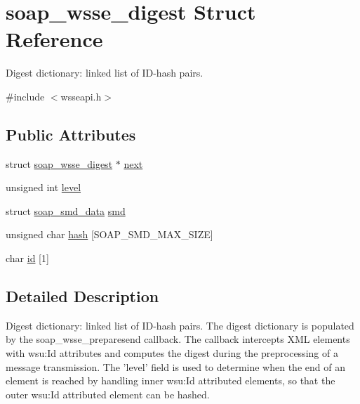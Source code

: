 \hypertarget{structsoap__wsse__digest}{
\section{soap\_\-wsse\_\-digest Struct Reference}
\label{structsoap__wsse__digest}
}


Digest dictionary: linked list of ID-\/hash pairs.  




{\ttfamily \#include $<$wsseapi.h$>$}

\subsection*{Public Attributes}
\begin{DoxyCompactItemize}
\item 
struct \hyperlink{structsoap__wsse__digest}{soap\_\-wsse\_\-digest} $\ast$ \hyperlink{structsoap__wsse__digest_a13360889b01e19791f5f28884f0a22a8}{next}
\item 
unsigned int \hyperlink{structsoap__wsse__digest_a37bf7969173878e54c311b6484af54fb}{level}
\item 
struct \hyperlink{structsoap__smd__data}{soap\_\-smd\_\-data} \hyperlink{structsoap__wsse__digest_a15e6a918067d5f6d575478751733523f}{smd}
\item 
unsigned char \hyperlink{structsoap__wsse__digest_a3f5c0f80cb1f005193388aadcacd18f5}{hash} \mbox{[}SOAP\_\-SMD\_\-MAX\_\-SIZE\mbox{]}
\item 
char \hyperlink{structsoap__wsse__digest_a544c388eef37eee69c7682d66c2fdd4f}{id} \mbox{[}1\mbox{]}
\end{DoxyCompactItemize}


\subsection{Detailed Description}
Digest dictionary: linked list of ID-\/hash pairs. The digest dictionary is populated by the soap\_\-wsse\_\-preparesend callback. The callback intercepts XML elements with wsu:Id attributes and computes the digest during the preprocessing of a message transmission. The 'level' field is used to determine when the end of an element is reached by handling inner wsu:Id attributed elements, so that the outer wsu:Id attributed element can be hashed. 

